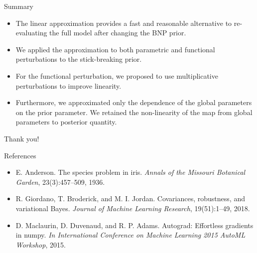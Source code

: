 \documentclass[10pt]{beamer}\usepackage[]{graphicx}\usepackage[]{color}
\begin{document}
\begin{frame}{Summary}

\begin{itemize}

\item The linear approximation provides a fast and reasonable alternative to re-evaluating the full model after changing the BNP prior. 

\pause 

\item We applied the approximation to both parametric and functional perturbations to the stick-breaking prior.

\pause 

\item For the functional perturbation, we proposed to use multiplicative perturbations to improve linearity. 

\pause 

\item Furthermore, we approximated only the dependence of the global parameters on the prior parameter. We retained the non-linearity of the map from global parameters to posterior quantity.

\end{itemize}


\end{frame}

\begin{frame}

Thank you!

\end{frame}

\begin{frame}{References}

\begin{itemize}
\item E. Anderson. The species problem in iris. {\itshape Annals of the Missouri Botanical Garden}, 23(3):457–509, 1936.

\item R. Giordano, T. Broderick, and M. I. Jordan. Covariances, robustness, and variational Bayes. {\itshape Journal of Machine Learning Research}, 19(51):1–49, 2018.

\item D. Maclaurin, D. Duvenaud, and R. P. Adams. Autograd: Effortless gradients in numpy. {\itshape In International Conference on Machine Learning 2015 AutoML Workshop}, 2015.

\end{itemize}

\end{frame}
\end{document}
